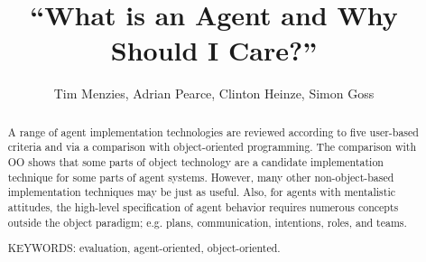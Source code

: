 



\newcommand{\fig}[1]{Figure~\ref{fig:#1}}
\newcommand{\bfig}[1]{(\fig{#1})}

\newcommand{\tbl}[1]{{\fig #1}}
\newcommand{\tion}[1]{\S\ref{sec:#1}}
\newcommand{\btion}[1]{(\tion{#1})}
\newcommand{\stion}[1]{\mbox{(see \tion{#1})}}

\newcommand{\bi}{\begin{itemize}}
\newcommand{\be}{\begin{enumerate}}
\newcommand{\ei}{\end{itemize}}
\newcommand{\ee}{\end{enumerate}}
\newcommand{\bd}{\begin{description}}
\newcommand{\ed}{\end{description}}



\title{``What is an Agent and Why Should I Care?''}
\author{Tim Menzies, Adrian Pearce,
Clinton Heinze, Simon Goss} 

\pagestyle{plain} \thispagestyle{plain} \maketitle

\begin{abstract}
A range of agent implementation technologies are reviewed
according to five user-based criteria and via a comparison with
object-oriented programming. The comparison with OO shows that
some parts of object technology are a candidate implementation
technique for some parts of agent systems. However, many other
non-object-based implementation techniques may be just as useful.
Also, for agents with mentalistic attitudes, the high-level
specification of agent behavior requires numerous concepts outside
the object paradigm; e.g. plans, communication, intentions, roles,
and teams.

KEYWORDS: evaluation, agent-oriented, object-oriented.
\end{abstract}

